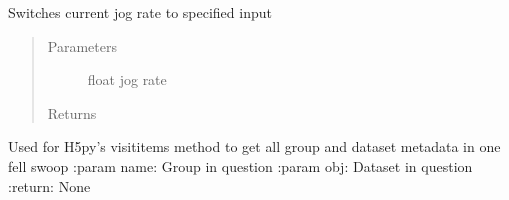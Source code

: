 \documentclass[letterpaper,10pt,english]{sphinxmanual}
\begin{document}
\begin{fulllineitems}

\begin{fulllineitems}
\label{\detokenize{index:droogCNC.TwoAxisStage.stop}}
\end{fulllineitems}


\begin{fulllineitems}
\label{\detokenize{index:droogCNC.TwoAxisStage.switchRate}}
\sphinxAtStartPar
Switches current jog rate to specified input
\begin{quote}\begin{description}
\item[{Parameters}] \leavevmode
\sphinxAtStartPar
{} \textendash{} float jog rate

\item[{Returns}] \leavevmode
\sphinxAtStartPar


\end{description}\end{quote}

\end{fulllineitems}


\end{fulllineitems}

\label{\detokenize{index:module-HDF5Methods}}

\begin{fulllineitems}
\label{\detokenize{index:HDF5Methods.__print_attrs}}
\sphinxAtStartPar
Used for H5py’s visititems method to get all group and dataset metadata in one fell swoop
:param name: Group in question
:param obj: Dataset in question
:return: None

\end{fulllineitems}
\end{document}

